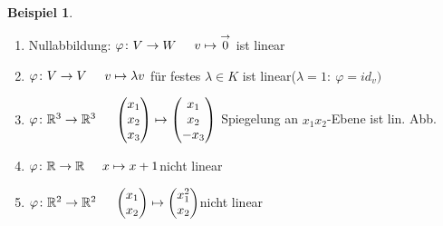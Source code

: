 \documentclass[a4paper,11pt]{article}
\newtheorem{bsp}[definition]{Beispiel}
\newcommand{\zerovec}{\overset{\rightarrow}{0}}
\newcommand{\hsp}{\hspace{5mm}}
\begin{document}
\begin{bsp}
\end{bsp}
\begin{enumerate}[label=\alph*)]
	\item Nullabbildung: $\varphi\colon V\rightarrow W\hsp v\mapsto\zerovec$ ist linear
	\item $\varphi\colon V\rightarrow V\hsp v\mapsto\lambda v$ für festes $\lambda\in K$ ist linear\hsp ($\lambda=1:\:\varphi=id_v)$
	\item $\varphi\colon\mathbb{R}^3\rightarrow\mathbb{R}^3\hsp\begin{pmatrix}x_1\\x_2\\x_3\end{pmatrix}\mapsto\begin{pmatrix}x_1\\x_2\\-x_3\end{pmatrix}$ Spiegelung an $x_1x_2$-Ebene ist lin. Abb.
	\item $\varphi\colon\mathbb{R}\rightarrow\mathbb{R}\hsp x\mapsto x+1$\hsp nicht linear
	\item $\varphi\colon\mathbb{R}^2\rightarrow\mathbb{R}^2\hsp\begin{pmatrix}x_1\\x_2\end{pmatrix}\mapsto\begin{pmatrix}x_1^2\\x_2\end{pmatrix}$\hsp nicht linear
\end{enumerate}
\end{document}
